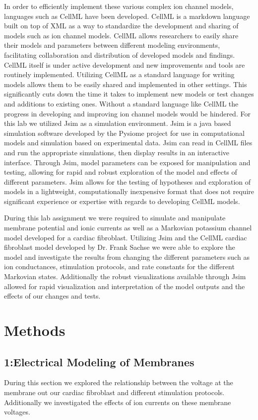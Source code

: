 \documentclass[12pt]{article}
\begin{document}
In order to efficiently implement these various complex ion channel models, languages such as CellML have been developed. CellML is a markdown language built on top of XML as a way to standardize the development and sharing of models such as ion channel models. CellML allows researchers to easily share their models and parameters between different modeling environments, facilitating collaboration and distribution of developed models and findings. CellML itself is under active development and new improvements and tools are routinely implemented. Utilizing CellML as a standard language for writing models allows them to be easily shared and implemented in other settings. This significantly cuts down the time it takes to implement new models or test changes and additions to existing ones. Without a standard language like CellML the progress in developing and improving ion channel models would be hindered. For this lab we utilized Jsim as a simulation environment. Jsim is a java based simulation software developed by the Pysiome project for use in computational models and simulation based on experimental data.\cite{Fink2011} Jsim can read in CellML files and run the appropriate simulations, then display results in an interactive interface. Through Jsim, model parameters can be exposed for manipulation and testing, allowing for rapid and robust exploration of the model and effects of different parameters. Jsim allows for the testing of hypotheses and exploration of models in a lightweight, computationally inexpensive format that does not require significant experience or expertise with regards to developing CellML models.
\par{}
During this lab assignment we were required to simulate and manipulate membrane potential and ionic currents as well as a Markovian potassium channel model developed for a cardiac fibroblast.\cite{Sachse2008} Utilizing Jsim and the CellML cardiac fibroblast model developed by Dr. Frank Sachse we were able to explore the model and investigate the results from changing the different parameters such as ion conductances, stimulation protocols, and rate constants for the different Markovian states. Additionally the robust visualizations available through Jsim allowed for rapid visualization and interpretation of the model outputs and the effects of our changes and tests.

\section{Methods}
\subsection{1:Electrical Modeling of Membranes}
During this section we explored the relationship between the voltage at the membrane out our cardiac fibroblast and different stimulation protocols. Additionally we investigated the effects of ion currents on these membrane voltages.
\end{document}

